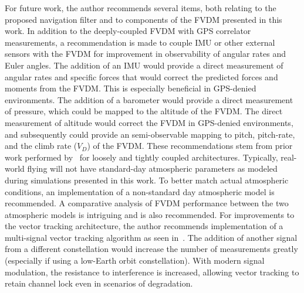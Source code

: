 For future work, the author recommends several items, both relating to the proposed navigation filter and to components of the FVDM presented in this work. In addition to the deeply-coupled FVDM with GPS correlator measurements, a recommendation is made to couple IMU or other external sensors with the FVDM for improvement in observability of angular rates and Euler angles. The addition of an IMU would provide a direct measurement of angular rates and specific forces that would correct the predicted forces and moments from the FVDM\@. This is especially beneficial in GPS-denied environments. The addition of a barometer would provide a direct measurement of pressure, which could be mapped to the altitude of the FVDM\@. The direct measurement of altitude would correct the FVDM in GPS-denied environments, and subsequently could provide an semi-observable mapping to pitch, pitch-rate, and the climb rate (\(V_D\)) of the FVDM\@. These recommendations stem from prior work performed by~\cite{khaghaniAssessmentVDMbasedAutonomous2018,khaghaniAutonomousVehicleDynamic2016,mwenegohaModelbasedTightlyCoupled2020} for loosely and tightly coupled architectures. Typically, real-world flying will not have standard-day atmospheric parameters as modeled during simulations presented in this work.  To better match actual atmospheric conditions, an implementation of a non-standard day atmospheric model is recommended. A comparative analysis of FVDM performance between the two atmospheric models is intriguing and is also recommended. For improvements to the vector tracking architecture, the author recommends implementation of a multi-signal vector tracking algorithm as seen in~\cite{givhanGPSL5Software2021}. The addition of another signal from a different constellation would increase the number of measurements greatly (especially if using a low-Earth orbit constellation). With modern signal modulation, the resistance to interference is increased, allowing vector tracking to retain channel lock even in scenarios of degradation.